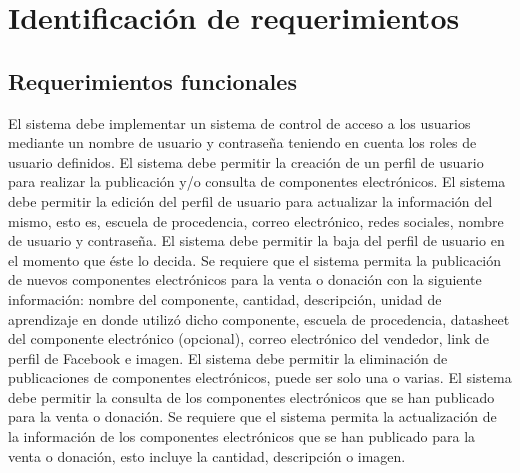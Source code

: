 \section{Identificación de requerimientos}	


\subsection{Requerimientos funcionales}

\begin{cdtRequirements}
		{El sistema debe implementar un sistema de control de acceso a los usuarios mediante un nombre de usuario y contraseña teniendo en cuenta los roles de usuario definidos.}
		{El sistema debe permitir la creación de un perfil de usuario para realizar la publicación y/o consulta de componentes electrónicos.}
		{El sistema debe permitir la edición del perfil de usuario para actualizar la información del mismo, esto es, escuela de procedencia, correo electrónico, redes sociales, nombre de usuario y contraseña.}
		{El sistema debe permitir la baja del perfil de usuario en el momento que éste lo decida.}
		{Se requiere que el sistema permita la publicación de nuevos componentes electrónicos para la venta o donación con la siguiente información: nombre del componente, cantidad, descripción, unidad de aprendizaje en donde utilizó dicho componente, escuela de procedencia, datasheet del componente electrónico (opcional), correo electrónico del vendedor, link de perfil de Facebook e imagen.}
	    {El sistema debe permitir la eliminación de publicaciones de componentes electrónicos, puede ser solo una o varias.}
	    {El sistema debe permitir la consulta de los componentes electrónicos que se han publicado para la venta o donación.}
	    {Se requiere que el sistema permita la actualización de la información de los componentes electrónicos que se han publicado para la venta o donación, esto incluye la cantidad, descripción o imagen.}

\end{cdtRequirements}
